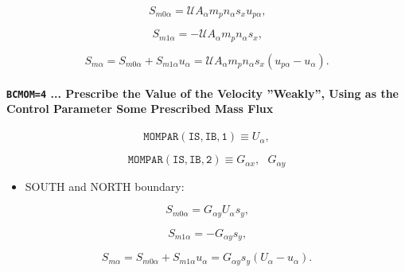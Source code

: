 \documentclass[11pt]{article}
\begin{document}
\bigskip

\begin{equation}
S_{m0\alpha}=\mathcal{U}A_{\alpha}m_{p}n_{\alpha}s_{x}u_{p\alpha}\text{,} 
\label{c120}
\end{equation}

\begin{equation}
S_{m1\alpha}=-\mathcal{U}A_{\alpha}m_{p}n_{\alpha}s_{x}\text{,} 
\label{c121}
\end{equation}

\begin{equation}
S_{m\alpha}=S_{m0\alpha}+S_{m1\alpha}u_{\alpha}=\mathcal{U}%
A_{\alpha}m_{p}n_{\alpha}s_{x}\left( u_{p\alpha}-u_{\alpha}\right) \text{.} 
\label{c122}
\end{equation}

\bigskip

\paragraph{\texttt{BCMOM=4} ... Prescribe the Value of the Velocity
''Weakly'', Using as the Control Parameter Some Prescribed Mass Flux}

\bigskip

\begin{equation*}
\mathtt{MOMPAR(IS,IB,1)}\equiv U_{\alpha}, 
\end{equation*}

\begin{equation*}
\mathtt{MOMPAR(IS,IB,2)}\equiv G_{\alpha x},\text{ }G_{\alpha y}
\end{equation*}

\bigskip

\begin{itemize}
\item  SOUTH and NORTH boundary:
\end{itemize}

\bigskip

\begin{equation}
S_{m0\alpha}=G_{\alpha y}U_{\alpha}s_{y}\text{,}   \label{c123}
\end{equation}

\begin{equation}
S_{m1\alpha}=-G_{\alpha y}s_{y}\text{,}   \label{c124}
\end{equation}

\begin{equation}
S_{m\alpha}=S_{m0\alpha}+S_{m1\alpha}u_{\alpha}=G_{\alpha y}s_{y}\left(
U_{\alpha}-u_{\alpha}\right) \text{.}   \label{c125}
\end{equation}
\end{document}
